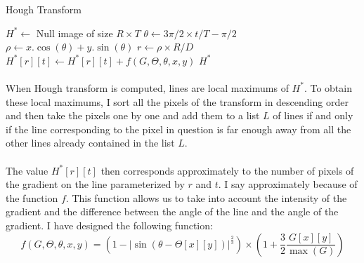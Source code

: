 \documentclass[11pt]{article}
\begin{document}
	\begin{algorithm}[h]
		\caption{Hough Transform}
		\label{alg:hough}
		\begin{algorithmic}
			\State $H^* \gets $ Null image of size $R \times T$
			\For{$(x, y) \in [0, W) \times [0; H) $ with $ G[x][y] > 0$}
				\For{$t \in [0; T)$}
					\State $\theta \gets 3 \pi / 2 \times t / T - \pi / 2$
					\State $\rho \gets x . \cos(\theta) + y . \sin(\theta)$
						\State $r \gets \rho \times R / D$
						\State $H^*[r][t] \gets H^*[r][t] + f(G, \Theta, \theta, x, y)$
					\EndIf
				\EndFor
			\EndFor
			\State \Return $H^*$
			\EndFunction
		\end{algorithmic}
	\end{algorithm}

	\paragraph{}
	When Hough transform is computed, lines are local maximums of $H^*$. To obtain these local maximums, I sort all the pixels of the transform in descending order and then take the pixels one by one and add them to a list $L$ of lines if and only if the line corresponding to the pixel in question is far enough away from all the other lines already contained in the list $L$.
	
	\paragraph{}
	The value $H^*[r][t]$ then corresponds approximately to the number of pixels of the gradient on the line parameterized by $r$ and $t$. I say approximately because of the function $f$. This function allows us to take into account the intensity of the gradient and the difference between the angle of the line and the angle of the gradient. I have designed the following function:
	$$ f(G, \Theta, \theta, x, y) = \left( 1 - \left| \sin \left( \theta - \Theta[x][y] \right) \right|^{\frac{2}{3}}\right) \times \left( 1 + \frac{3}{2} \dfrac{G[x][y]}{\max (G)} \right) $$
	
\end{document}

